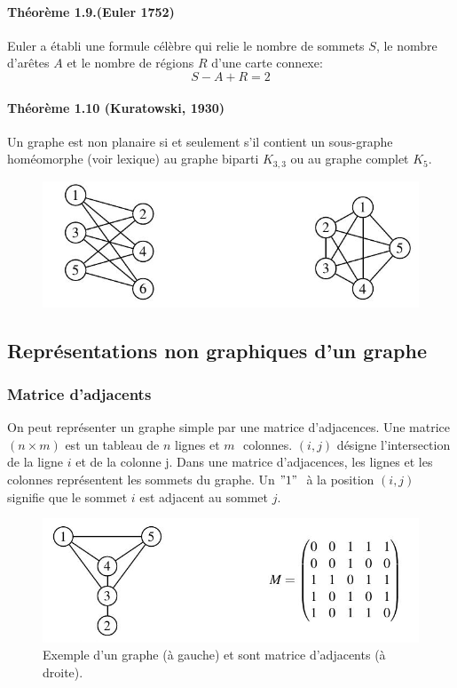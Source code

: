 \paragraph*{Théorème 1.9.(Euler 1752)}
Euler a établi une formule célèbre qui relie le nombre de sommets $ S $, le nombre
d'arêtes $ A $ et le nombre de régions $ R $ d'une carte connexe:
$$ S-A+R=2 $$

\paragraph*{Théorème 1.10 (Kuratowski, 1930)}Un graphe est non planaire si et seulement s'il contient 
un sous-graphe homéomorphe (voir lexique) au graphe biparti $ K_{3,3} $ ou au graphe complet $ K_{5} $.

\begin{figure}[h]
\centering
\includegraphics[width=0.7\linewidth]{images/graph11}
\label{fig:graph11}
\end{figure}

\newpage
\subsection{Représentations non graphiques d'un graphe}
\subsubsection{Matrice d'adjacents}
\noindent On peut représenter un graphe simple par une matrice d'adjacences. Une matrice $ (n\times m) $
est un tableau de $ n $ lignes et $ m$  $ $ colonnes. $(i, j)$ désigne l'intersection de la ligne $ i$ et de
la colonne j. Dans une matrice d'adjacences, les lignes et les colonnes représentent les
sommets du graphe. Un $ "1" $  $ $ à la position $ (i, j) $ signifie que le sommet $ i $ est adjacent au
sommet $ j $.

\begin{figure}[h]
\centering
\includegraphics[width=0.7\linewidth]{images/graph7}
\caption[Exemple d'un graphe (à gauche) et sont matrice d'adjacents (à droite).]{Exemple d'un graphe (à gauche) et sont matrice d'adjacents (à droite).}
\label{fig:graph7}
\end{figure}
